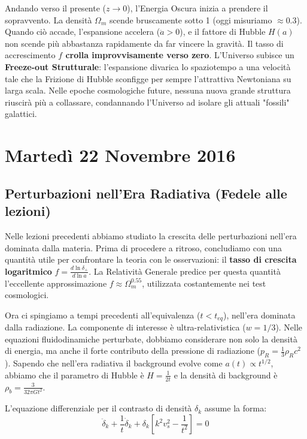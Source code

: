 \documentclass[11pt,a4paper]{report}
\begin{document}
Andando verso il presente ($z \to 0$), l'Energia Oscura inizia a prendere il sopravvento. La densità $\Omega_m$ scende bruscamente sotto 1 (oggi misuriamo $\approx 0.3$). Quando ciò accade, l'espansione accelera ($\ddot{a} > 0$), e il fattore di Hubble $H(a)$ non scende più abbastanza rapidamente da far vincere la gravità. Il tasso di accrescimento \textbf{$f$ crolla improvvisamente verso zero}.
L'Universo subisce un \textbf{Freeze-out Strutturale}: l'espansione divarica lo spaziotempo a una velocità tale che la Frizione di Hubble sconfigge per sempre l'attrattiva Newtoniana su larga scala. Nelle epoche cosmologiche future, nessuna nuova grande struttura riuscirà più a collassare, condannando l'Universo ad isolare gli attuali "fossili" galattici.

\chapter{Martedì 22 Novembre 2016}

\section{Perturbazioni nell'Era Radiativa (Fedele alle lezioni)}

Nelle lezioni precedenti abbiamo studiato la crescita delle perturbazioni nell'era dominata dalla materia. Prima di procedere a ritroso, concludiamo con una quantità utile per confrontare la teoria con le osservazioni: il \textbf{tasso di crescita logaritmico} $f = \frac{d\ln \delta_+}{d\ln a}$. La Relatività Generale predice per questa quantità l'eccellente approssimazione $f \approx \Omega_m^{0.55}$, utilizzata costantemente nei test cosmologici.

Ora ci spingiamo a tempi precedenti all'equivalenza ($t < t_{eq}$), nell'era dominata dalla radiazione. La componente di interesse è ultra-relativistica ($w=1/3$). Nelle equazioni fluidodinamiche perturbate, dobbiamo considerare non solo la densità di energia, ma anche il forte contributo della pressione di radiazione ($p_R = \frac{1}{3}\rho_R c^2$).
Sapendo che nell'era radiativa il background evolve come $a(t) \propto t^{1/2}$, abbiamo che il parametro di Hubble è $H = \frac{1}{2t}$ e la densità di background è $\rho_b = \frac{3}{32\pi G t^2}$.

L'equazione differenziale per il contrasto di densità $\delta_k$ assume la forma:
\begin{equation}
\ddot{\delta}_k + \frac{1}{t}\dot{\delta}_k + \delta_k \left[ k^2 v_s^2 - \frac{1}{t^2} \right] = 0
\end{equation}
\end{document}
